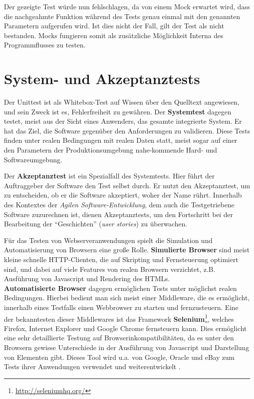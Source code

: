   Der gezeigte Test würde nun fehlschlagen, da von einem Mock erwartet wird, dass die nachgeahmte Funktion während des Tests genau einmal mit den genannten Parametern aufgerufen wird. Ist dies nicht der Fall, gilt der Test als nicht bestanden. Mocks fungieren somit als zusätzliche Möglichkeit Interna des Programmflusses zu testen.

\section{System- und Akzeptanztests}
\label{sec:acceptance}
Der Unittest ist als Whitebox-Test auf Wissen über den Quelltext angewiesen, und sein Zweck ist es, Fehlerfreiheit zu gewähren. Der \textbf{Systemtest} dagegen testet, meist aus der Sicht eines Anwenders, das gesamte integrierte System. Er hat das Ziel, die Software gegenüber den Anforderungen zu validieren. Diese Tests finden unter realen Bedingungen mit realen Daten statt, meist sogar auf einer den Parametern der Produktionsumgebung nahe-kommende Hard- und Softwareumgebung.

Der \textbf{Akzeptanztest} ist ein Spezialfall des Systemtests. Hier führt der Auftraggeber der Software den Test selbst durch. Er nutzt den Akzeptanztest, um zu entscheiden, ob er die Software akzeptiert, woher der Name rührt.
Innerhalb des Kontextes der \textit{Agilen Software-Entwicklung}, dem auch die Testgetriebene Software zuzurechnen ist, dienen Akzeptanztests, um den Fortschritt bei der Bearbeitung der "`Geschichten"' (\textit{user stories}) zu überwachen.

Für das Testen von Webserveranwendungen spielt die Simulation und Automatisierung von Browsern eine große Rolle. \textbf{Simulierte Browser} sind meist kleine schnelle HTTP-Clienten, die auf Skripting und Fernsteuerung optimiert sind, und dabei auf viele Features von realen Browsern verzichtet, z.B. Ausführung von Javascript und Rendering des HTMLs. \\
\textbf{Automatisierte Browser} dagegen ermöglichen Tests unter möglichst realen Bedingungen. Hierbei bedient man sich meist einer Middleware, die es ermöglicht, innerhalb eines Testfalls einen Webbrowser zu starten und fernzusteuern. Eine der bekanntesten dieser Middlewares ist das Framework \textbf{Selenium}\footnote{\url{http://seleniumhq.org/}}, welches Firefox, Internet Explorer und Google Chrome fernsteuern kann. Dies ermöglicht eine sehr detaillierte Testung auf Browserinkompatibilitäten, da es unter den Browsern gewisse Unterschiede in der Ausführung von Javascript und Darstellung von Elementen gibt. Dieses Tool wird u.a. von Google, Oracle und eBay zum Tests ihrer Anwendungen verwendet und weiterentwickelt \citep{selenium_hq_selenium_2010}.
